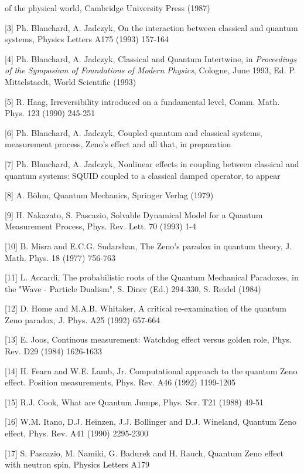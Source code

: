 of the physical world, Cambridge University Press (1987)
\item{[3]} Ph. Blanchard, A. Jadczyk, On the interaction between
classical and quantum systems, Physics Letters {A175} (1993)
157-164
\item{[4]} Ph. Blanchard, A. Jadczyk, Classical and Quantum Intertwine,
in {\it Proceedings of the Symposium of Foundations of Modern Physics},
Cologne, June 1993, Ed. P. Mittelstaedt, World Scientific (1993)
\item{[5]} R. Haag, Irreversibility introduced on a fundamental level,
Comm. Math. Phys. {123} (1990) 245-251
\item{[6]} Ph. Blanchard, A. Jadczyk, Coupled quantum and classical
systems, measurement process, Zeno's effect and all that, in
preparation
\item{[7]} Ph. Blanchard, A. Jadczyk, Nonlinear effects in coupling
between classical and quantum systems: SQUID coupled to a classical
damped operator, to appear
\item{[8]} A. B\"ohm, Quantum Mechanics, Springer Verlag (1979)
\item{[9]} H. Nakazato, S. Pascazio, Solvable Dynamical Model for a
Quantum Measurement Process, Phys. Rev. Lett. {70} (1993)
1-4
\item{[10]} B. Misra and E.C.G. Sudarshan, The Zeno's paradox in
quantum theory, J. Math. Phys. {18} (1977) 756-763
\item{[11]} L. Accardi, The probabilistic roots of the
Quantum Mechanical Paradoxes, in the "Wave - Particle Dualism",
S. Diner (Ed.) 294-330, S. Reidel (1984)
\item{[12]} D. Home and M.A.B. Whitaker, A critical re-examination of
the quantum Zeno paradox, J. Phys. {A25} (1992) 657-664
\item{[13]} E. Joos, Continous measurement: Watchdog effect versus
golden role, Phys. Rev. {D29} (1984) 1626-1633
\item{[14]} H. Fearn and W.E. Lamb, Jr. Computational approach to the
quantum Zeno effect. Position measurements, Phys. Rev.
{A46} (1992) 1199-1205
\item{[15]} R.J. Cook, What are Quantum Jumps, Phys. Scr. {
T21} (1988) 49-51
\item{[16]} W.M. Itano, D.J. Heinzen, J.J. Bollinger and
D.J. Wineland, Quantum Zeno effect, Phys. Rev. {A41} (1990)
2295-2300
\item{[17]} S. Pascazio, M. Namiki, G. Badurek and H. Rauch, Quantum
Zeno effect with neutron spin, Physics Letters {A179}
